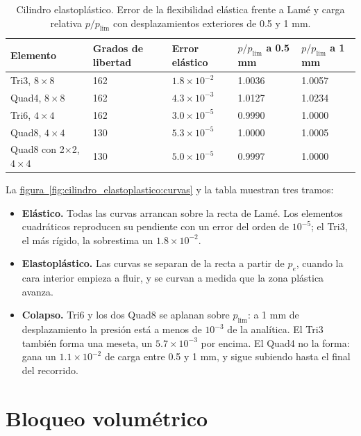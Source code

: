 \documentclass[11pt,oneside]{report}
\begin{document}
\begin{table}[h]
\centering
\caption{Cilindro elastoplástico. Error de la flexibilidad elástica frente a Lamé y carga relativa $p/p_{\mathrm{lim}}$ con desplazamientos exteriores de 0.5 y 1 mm.}
\begin{tabularx}{\textwidth}{YYYYY}
\hline
\textbf{Elemento} & \textbf{Grados de libertad} & \textbf{Error elástico} & \textbf{$p/p_{\mathrm{lim}}$ a 0.5 mm} & \textbf{$p/p_{\mathrm{lim}}$ a 1 mm} \\
\hline
Tri3, $8 \times 8$ & 162 & $1.8\times 10^{-2}$ & 1.0036 & 1.0057 \\
Quad4, $8 \times 8$ & 162 & $4.3\times 10^{-3}$ & 1.0127 & 1.0234 \\
Tri6, $4 \times 4$ & 162 & $3.0\times 10^{-5}$ & 0.9990 & 1.0000 \\
Quad8, $4 \times 4$ & 130 & $5.3\times 10^{-5}$ & 1.0000 & 1.0005 \\
Quad8 con 2\ensuremath{\times}2, $4 \times 4$ & 130 & $5.0\times 10^{-5}$ & 0.9997 & 1.0000 \\
\hline
\end{tabularx}
\end{table}
La \hyperref[fig:cilindro_elastoplastico:curvas]{figura~\ref*{fig:cilindro_elastoplastico:curvas}} y la tabla muestran tres tramos:

\begin{itemize}
  \item \textbf{Elástico.} Todas las curvas arrancan sobre la recta de Lamé. Los elementos cuadráticos reproducen su pendiente con un error del orden de $10^{-5}$; el Tri3, el más rígido, la sobrestima un $1.8\times 10^{-2}$.
  \item \textbf{Elastoplástico.} Las curvas se separan de la recta a partir de $p_e$, cuando la cara interior empieza a fluir, y se curvan a medida que la zona plástica avanza.
  \item \textbf{Colapso.} Tri6 y los dos Quad8 se aplanan sobre $p_{\mathrm{lim}}$: a 1 mm de desplazamiento la presión está a menos de $10^{-3}$ de la analítica. El Tri3 también forma una meseta, un $5.7\times 10^{-3}$ por encima. El Quad4 no la forma: gana un $1.1\times 10^{-2}$ de carga entre 0.5 y 1 mm, y sigue subiendo hasta el final del recorrido.
\end{itemize}

\section{Bloqueo volumétrico}
\end{document}

